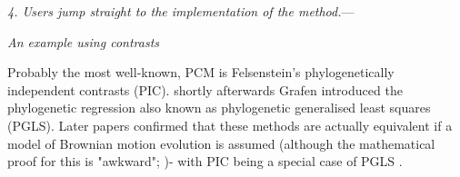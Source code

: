 \documentclass[a4paper,12pt]{article}
\renewcommand{\subsection}[1]{
  \bigskip
  \begin{center}
  \begin{large}
  \normalfont\itshape #1
  \end{large}
  \end{center}
}
\renewcommand{\subsubsection}[1]{%
\vspace{2ex}
\noindent
\textit{#1.}---}
\begin{document}
\subsubsection{4. Users jump straight to the implementation of the method}






\subsection{An example using contrasts}
Probably the most well-known, PCM is Felsenstein's \citeyearpar{felsenstein1985phylogenies} phylogenetically independent contrasts (PIC). shortly afterwards Grafen introduced the phylogenetic regression also known as phylogenetic generalised least squares (PGLS). Later papers confirmed that these methods are actually equivalent if a model of Brownian motion evolution is assumed (although the mathematical proof for this is "awkward"; \citet{rohlf2001comparative,blomberg2012independent})- with PIC being a special case of PGLS \citet{blomberg2012independent,rohle2006comment,rohlf2001comparative,garland2000using}.
\end{document}
